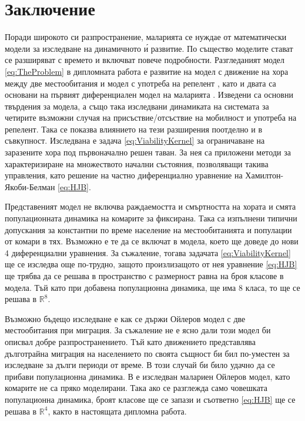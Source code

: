 \section{\hspace{1em} Заключение}
Поради широкото си разпространение, маларията се нуждае от математически модели за изследване на динамичното \'{и} развитие.
По същество моделите стават се разширяват с времето и включват повече подробности.
Разгледаният модел \eqref{eq:TheProblem} в дипломната работа е развитие на модел с движение на хора между две местообитания \cite{Bichara2016} и модел с употреба на репелент \cite{Rashkov2022}, като и двата са основани на първият диференциален модел на маларията \cite{Smith2012}.
Изведени са основни твърдения за модела, а също така изследвани динамиката на системата за четирите възможни случая на присъствие/отсъствие на мобилност и употреба на репелент.
Така се показва влиянието на тези разширения поотделно и в съвкупност.
Изследвана е задача \eqref{eq:ViabilityKernel} за ограничаване на заразените хора под първоначално решен таван.
За нея са приложени методи \cite{Zidani2013} за характеризиране на множеството начални състояния, позволяващи такива управления, като решение на частно диференциално уравнение на Хамилтон-Якоби-Белман \eqref{eq:HJB}.

Представеният модел не включва раждаемостта и смъртността на хората и смята популационната динамика на комарите за фиксирана.
Така са изпълнени типични допускания за константни по време население на местообитанията и популации от комари в тях.
Възможно е те да се включат в модела, което ще доведе до нови 4 диференциални уравнения.
За съжаление, тогава задачата \eqref{eq:ViabilityKernel} ще се изследва още по-трудно, защото произлизащото от нея уравнение \eqref{eq:HJB} ще трябва да се решава в пространство с размерност равна на броя класове в модела.
Тъй като при добавена популационна динамика, ще има 8 класа, то ще се решава в $\mathbb{R}^8$.

Възможно бъдещо изследване е как се държи Ойлеров модел с две местообитания при миграция.
За съжаление не е ясно дали този модел би описвал добре разпространението.
Тъй като движението представлява дълготрайна миграция на населението по своята същност би бил по-уместен за изследване за дълги периоди от време.
В този случай би било удачно да се прибави популационна динамика.
В \cite{Prosper2012} е изследван малариен Ойлеров модел, като комарите не са пряко моделирани.
Така ако се разглежда само човешката популационна динамика, броят класове ще се запази и съответно \eqref{eq:HJB} ще се решава в $\mathbb{R}^4$, както в настоящата дипломна работа.

